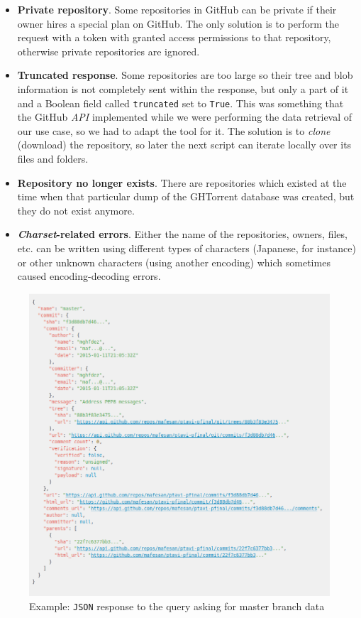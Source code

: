 \documentclass[a4paper, 12pt]{book}
\begin{document}
\begin{itemize}
  \item \textbf{Private repository}. Some repositories in GitHub can be private if their owner hires a special
  plan on GitHub. The only solution is to perform the request with
  a token with granted access permissions to that repository, otherwise private repositories are ignored.
  \item \textbf{Truncated response}. Some repositories are too large so their tree and blob information is not completely
  sent within the response, but only a part of it and a Boolean field called \texttt{truncated} set to \texttt{True}.
  This was something that the GitHub \textit{API} implemented while we were performing the data retrieval of our
  use case, so we had to adapt the tool for it. The solution is to \textit{clone} (download) the repository,
  so later the next script can iterate locally over its files and folders.
  \item \textbf{Repository no longer exists}. There are repositories which existed at the time when that particular
  dump of the GHTorrent database was created, but they do not exist anymore.
  \item \textbf{\textit{Charset}-related errors}. Either the name of the repositories, owners, files, etc. can be written
  using different types of characters (Japanese, for instance) or other unknown characters (using another encoding)
  which sometimes caused encoding-decoding errors.
\end{itemize}
\label{sec:data-extraction}
\begin{figure}
  \centering
  \includegraphics[width=15cm, keepaspectratio]{img/gh-api-master-json-example}
  \caption{Example: \texttt{JSON} response to the query asking for master branch data}
  \label{fig:gh-api-master-json}
\end{figure}
\end{document}
